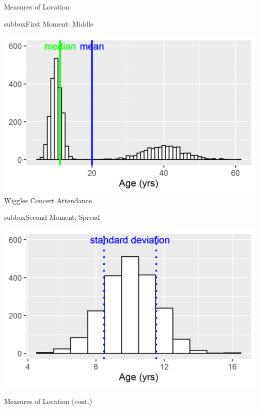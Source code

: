 \documentclass[10pt,a4paper]{article}
\begin{document}
\begin{multicols}{3}
\begin{textbox}{Measures of Location}
\begin{subbox}{subbox}{First Moment: Middle}
\begin{center}
\tiny
    \includegraphics[width=\textwidth]{Figures/Measures_of_Location/middle.png}
    Wiggles Concert Attendance
\end{center}

\end{subbox}

\begin{subbox}{subbox}{Second Moment: Spread}
\begin{center}
\tiny
    \includegraphics[width=\textwidth]{Figures/Measures_of_Location/range.png}
\end{center}

\end{subbox}
\end{textbox}
\begin{textbox}{Measures of Location (cont.)}


\end{textbox}
\end{multicols}
\end{document}
